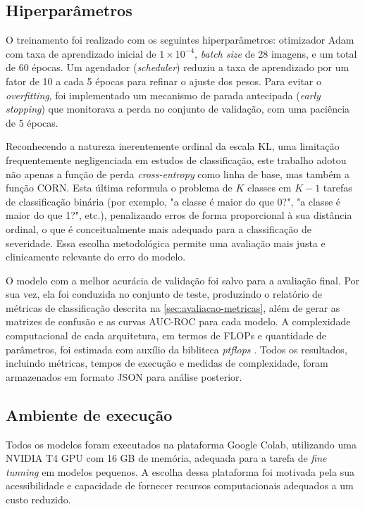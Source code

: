 \subsection{Hiperparâmetros}

O treinamento foi realizado com os seguintes hiperparâmetros: otimizador Adam com taxa de aprendizado inicial de $1 \times 10^{-4}$, \textit{batch size} de 28 imagens, e um total de 60 épocas. Um agendador (\textit{scheduler}) reduziu a taxa de aprendizado por um fator de 10 a cada 5 épocas para refinar o ajuste dos pesos. Para evitar o \textit{overfitting}, foi implementado um mecanismo de parada antecipada (\textit{early stopping}) que monitorava a perda no conjunto de validação, com uma paciência de 5 épocas.

Reconhecendo a natureza inerentemente ordinal da escala KL, uma limitação frequentemente negligenciada em estudos de classificação, este trabalho adotou não apenas a função de perda \textit{cross-entropy} como linha de base, mas também a função CORN. Esta última reformula o problema de $K$ classes em $K-1$ tarefas de classificação binária (por exemplo, "a classe é maior do que 0?", "a classe é maior do que 1?", etc.), penalizando erros de forma proporcional à sua distância ordinal, o que é conceitualmente mais adequado para a classificação de severidade. Essa escolha metodológica permite uma avaliação mais justa e clinicamente relevante do erro do modelo.

O modelo com a melhor acurácia de validação foi salvo para a avaliação final. Por sua vez, ela foi conduzida no conjunto de teste, produzindo o relatório de métricas de classificação descrita na \autoref{sec:avaliacao-metricas}, além de gerar as matrizes de confusão e as curvas AUC-ROC para cada modelo. A complexidade computacional de cada arquitetura, em termos de FLOPs e quantidade de parâmetros, foi estimada com auxílio da bibliteca \textit{ptflops} \citep{ptflops}. Todos os resultados, incluindo métricas, tempos de execução e medidas de complexidade, foram armazenados em formato JSON para análise posterior.

\subsection{Ambiente de execução}

Todos os modelos foram executados na plataforma Google Colab, utilizando uma NVIDIA T4 GPU com 16 GB de memória, adequada para a tarefa de \textit{fine tunning} em modelos pequenos. A escolha dessa plataforma foi motivada pela sua acessibilidade e capacidade de fornecer recursos computacionais adequados a um custo reduzido.

